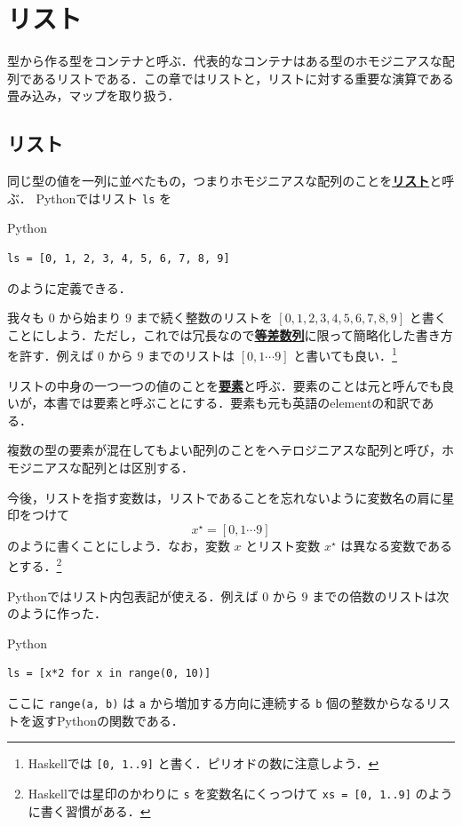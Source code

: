 \documentclass[a4paper,twocolumn]{jsbook}
\newcommand{\programminglanguage}[1]{\textsf{#1}}
\newcommand{\haskell}{\programminglanguage{Haskell}}
\newcommand{\python}{\programminglanguage{Python}}
\newenvironment{leader}{\begingroup\gt}{\endgroup}
\newcommand{\keyword}[1]{{\underline{\textbf{#1}}}}
\newcommand{\code}[1]{\texttt{#1}}
\newenvironment{pythoncode}{\begin{itembox}[r]{\python}}{\end{itembox}}
\newcommand{\mListWith}[1]{\left[#1\right]}
\newcommand{\mList}[1]{{#1}^\mathrm{\star}}
\begin{document}
\chapter{リスト}
\label{ch:list}

\begin{leader}
型から作る型をコンテナと呼ぶ．代表的なコンテナはある型のホモジニアスな配列であるリストである．この章ではリストと，リストに対する重要な演算である畳み込み，マップを取り扱う．
\end{leader}


\section{リスト}

同じ型の値を一列に並べたもの，つまりホモジニアスな配列のことを\keyword{リスト}と呼ぶ．
\python ではリスト \code{ls} を
\begin{pythoncode}
\begin{verbatim}
ls = [0, 1, 2, 3, 4, 5, 6, 7, 8, 9]
\end{verbatim}
\end{pythoncode}
のように定義できる．

我々も $0$ から始まり $9$ まで続く整数のリストを $\mListWith{0,1,2,3,4,5,6,7,8,9}$ と書くことにしよう．ただし，これでは冗長なので\keyword{等差数列}に限って簡略化した書き方を許す．例えば $0$ から $9$ までのリストは $\mListWith{0,1\dotsb9}$ と書いても良い．\footnote{\haskell では \code{[0, 1..9]} と書く．ピリオドの数に注意しよう．}

リストの中身の一つ一つの値のことを\keyword{要素}と呼ぶ．要素のことは元と呼んでも良いが，本書では要素と呼ぶことにする．要素も元も英語のelementの和訳である．

複数の型の要素が混在してもよい配列のことをヘテロジニアスな配列と呼び，ホモジニアスな配列とは区別する．

今後，リストを指す変数は，リストであることを忘れないように変数名の肩に星印をつけて
\begin{equation}
\mList{x}=\mListWith{0,1\dotsb9}
\end{equation}
のように書くことにしよう．なお，変数 $x$ とリスト変数 $\mList{x}$ は異なる変数であるとする．\footnote{\haskell では星印のかわりに \code{s} を変数名にくっつけて \code{xs = [0, 1..9]} のように書く習慣がある．}

\python ではリスト内包表記が使える．例えば $0$ から $9$ までの倍数のリストは次のように作った．
\begin{pythoncode}
\begin{verbatim}
ls = [x*2 for x in range(0, 10)]
\end{verbatim}
\end{pythoncode}
ここに \code{range(a, b)} は \code{a} から増加する方向に連続する \code{b} 個の整数からなるリストを返す\python の関数である．
\end{document}
